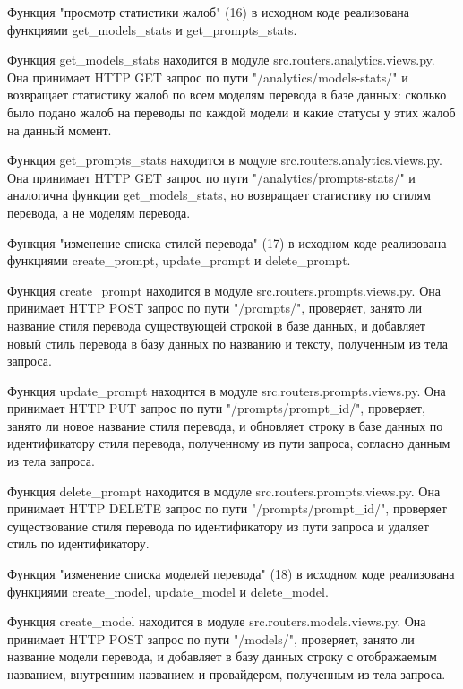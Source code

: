 
Функция "просмотр статистики жалоб" (16) в исходном коде реализована функциями get\_models\_stats и get\_prompts\_stats.

Функция get\_models\_stats находится в модуле src.routers.analytics.views.py. Она принимает HTTP GET запрос по пути "/analytics/models-stats/" и возвращает статистику жалоб по всем моделям перевода в базе данных: сколько было подано жалоб на переводы по каждой модели и какие статусы у этих жалоб на данный момент.

Функция get\_prompts\_stats находится в модуле src.routers.analytics.views.py. Она принимает HTTP GET запрос по пути "/analytics/prompts-stats/" и аналогична функции get\_models\_stats, но возвращает статистику по стилям перевода, а не моделям перевода.


Функция "изменение списка стилей перевода" (17) в исходном коде реализована функциями create\_prompt, update\_prompt и delete\_prompt.

Функция create\_prompt находится в модуле src.routers.prompts.views.py. Она принимает HTTP POST запрос по пути "/prompts/", проверяет, занято ли название стиля перевода существующей строкой в базе данных, и добавляет новый стиль перевода в базу данных по названию и тексту, полученным из тела запроса.

Функция update\_prompt находится в модуле src.routers.prompts.views.py. Она принимает HTTP PUT запрос по пути "/prompts/{prompt\_id}/", проверяет, занято ли новое название стиля перевода, и обновляет строку в базе данных по идентификатору стиля перевода, полученному из пути запроса, согласно данным из тела запроса.

Функция delete\_prompt находится в модуле src.routers.prompts.views.py. Она принимает HTTP DELETE запрос по пути "/prompts/{prompt\_id}/", проверяет существование стиля перевода по идентификатору из пути запроса и удаляет стиль по идентификатору.


Функция "изменение списка моделей перевода" (18) в исходном коде реализована функциями create\_model, update\_model и delete\_model.

Функция create\_model находится в модуле src.routers.models.views.py. Она принимает HTTP POST запрос по пути "/models/", проверяет, занято ли название модели перевода, и добавляет в базу данных строку с отображаемым названием, внутренним названием и провайдером, полученным из тела запроса.

